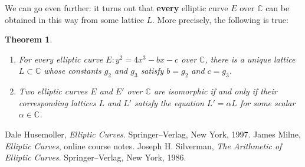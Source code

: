\documentclass[12pt]{article}
\newcommand{\C}{\mathbb{C}}
\newtheorem{theorem}{Theorem}
\theoremstyle{definition}
\begin{document}
We can go even further: it turns out that {\bf every} elliptic curve $E$ over $\C$ can be obtained in this way from some lattice $L$. More precisely, the following is true:

\begin{theorem}
\begin{enumerate}
\item For every elliptic curve $E: y^2 = 4x^3 - b x - c$ over $\C$, there is a unique lattice $L \subset \C$ whose constants $g_2$ and $g_3$ satisfy $b = g_2$ and $c = g_3$.
\item Two elliptic curves $E$ and $E'$ over $\C$ are isomorphic if and only if their corresponding lattices $L$ and $L'$ satisfy the equation $L' = \alpha L$ for some scalar $\alpha \in \C$.
\end{enumerate}
\end{theorem}

\begin{thebibliography}{9}
 Dale Husemoller, {\em Elliptic Curves}. Springer--Verlag, New York, 1997.
 James Milne, {\em Elliptic Curves}, online course notes. 
 Joseph H. Silverman, {\em The Arithmetic of Elliptic Curves}. Springer--Verlag, New York, 1986.
\end{thebibliography}
\end{document}
